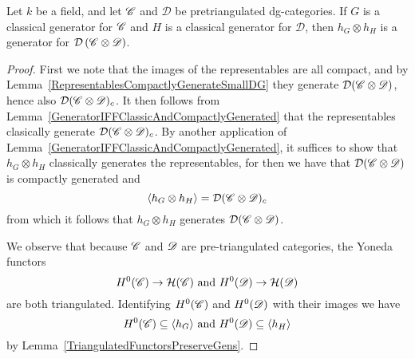 \documentclass[dissertation.tex]{subfiles}
\begin{document}
        \begin{thm}
          Let $k$ be a field, and let $\mathscr{C}$ and $\mathscr{D}$ be pretriangulated dg-categories.
          If $G$ is a classical generator for $\mathscr{C}$ and $H$ is a classical generator for $\mathscr{D}$, then $h_G \otimes h_H$ is a generator for $\mathcal{D}\left(\mathscr{C} \otimes \mathscr{D}\right)$.
          
          \begin{proof}
            First we note that the images of the representables are all compact, and by Lemma~\ref{RepresentablesCompactlyGenerateSmallDG} they generate $\mathcal{D}(\mathscr{C} \otimes \mathscr{D})$, hence also $\mathcal{D}(\mathscr{C} \otimes \mathscr{D})_c$.
            It then follows from Lemma~\ref{GeneratorIFFClassicAndCompactlyGenerated} that the representables clasically generate $\mathcal{D}(\mathscr{C} \otimes \mathscr{D})_c$.
            By another application of Lemma~\ref{GeneratorIFFClassicAndCompactlyGenerated}, it suffices to show that $h_G \otimes h_H$ classically generates the representables, for then we have that $\mathcal{D}(\mathscr{C} \otimes \mathscr{D})$ is compactly generated and 
            $$\langle h_G \otimes h_H \rangle = \mathcal{D}(\mathscr{C} \otimes \mathscr{D})_c$$
            from which it follows that $h_G \otimes h_H$ generates $\mathcal{D}(\mathscr{C} \otimes \mathscr{D})$.
            
            We observe that because $\mathscr{C}$ and $\mathscr{D}$ are pre-triangulated categories, the Yoneda functors
            $$H^0(\mathscr{C}) \to \mathcal{H}(\mathscr{C})\ \text{and}\ H^0(\mathscr{D}) \to \mathcal{H}(\mathscr{D})$$
            are both triangulated.
            Identifying $H^0(\mathscr{C})$ and $H^0(\mathscr{D})$ with their images we have
            $$H^0(\CC) \subseteq \langle h_G \rangle\ \text{and}\ H^0(\D) \subseteq \langle h_H \rangle$$
            by Lemma~\ref{TriangulatedFunctorsPreserveGens}.
            

\end{proof}
\end{thm}
\end{document}

